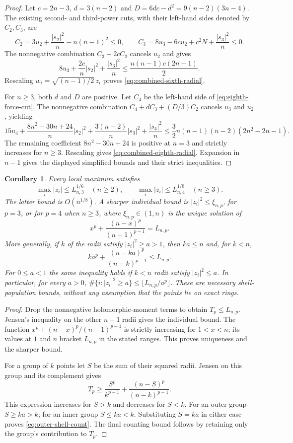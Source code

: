 \documentclass[11pt]{article}
\newtheorem{corollary}[theorem]{Corollary}
\theoremstyle{remark}
\numberwithin{equation}{section}
\begin{document}
\begin{proof}
Let $c=2n-3$, $d=3(n-2)$ and
$D=6dc-d^2=9(n-2)(3n-4)$.  The existing second- and third-power
cuts, with their left-hand sides denoted by $C_2,C_3$, are
\[
 C_2=3u_2+\frac{|s_2|^2}{n}-n(n-1)^2\le0,
 \qquad
 C_3=8u_3-6cu_2+c^2N+\frac{|s_3|^2}{n}\le0.
\]
The nonnegative combination $C_3+2cC_2$ cancels $u_2$ and gives
\[
 8u_3+\frac{2c}{n}|s_2|^2+\frac{|s_3|^2}{n}
 \le\frac{n(n-1)c(2n-1)}2.
\]
Rescaling $w_i=\sqrt{(n-1)/2}\,z_i$ proves
\eqref{eq:combined-sixth-radial}.

For $n\ge3$, both $d$ and $D$ are positive.  Let $C_4$ be the
left-hand side of \eqref{eq:eighth-force-cut}.  The nonnegative
combination $C_4+dC_3+(D/3)C_2$ cancels $u_3$ and $u_2$, yielding
\[
 15u_4+\frac{8n^2-30n+24}{n}|s_2|^2
       +\frac{3(n-2)}{n}|s_3|^2+\frac{|s_4|^2}{n}
 \le\frac32n(n-1)(n-2)(2n^2-2n-1).
\]
The remaining coefficient $8n^2-30n+24$ is positive at $n=3$
and strictly increases for $n\ge3$.  Rescaling gives
\eqref{eq:combined-eighth-radial}.  Expansion in $n-1$ gives the
displayed simplified bounds and their strict inequalities.
\end{proof}

\begin{corollary}\label{cor:local-radius-and-shells}
Every local maximum satisfies
\[
 \max_i|z_i|\le L_{n,3}^{1/6}\quad(n\ge2),\qquad
 \max_i|z_i|\le L_{n,4}^{1/8}\quad(n\ge3).
\]
The latter bound is $O(n^{1/8})$.  A sharper individual bound is
$|z_i|^2\le\xi_{n,p}$, for $p=3$, or for $p=4$ when $n\ge3$,
where $\xi_{n,p}\in(1,n)$ is the unique solution of
\[
 x^p+\frac{(n-x)^p}{(n-1)^{p-1}}=L_{n,p}.
\]
More generally, if $k$ of the radii satisfy $|z_i|^2\ge a>1$,
then $ka\le n$ and, for $k<n$,
\begin{equation}\label{eq:outer-shell-count}
 k a^p+\frac{(n-ka)^p}{(n-k)^{p-1}}\le L_{n,p}.
\end{equation}
For $0\le a<1$ the same inequality holds if $k<n$ radii satisfy
$|z_i|^2\le a$.  In particular,
for every $a>0$,
$\#\{i:|z_i|^2\ge a\}\le\lfloor L_{n,p}/a^p\rfloor$.
These are necessary shell-population bounds, without any assumption
that the points lie on exact rings.
\end{corollary}

\begin{proof}
Drop the nonnegative holomorphic-moment terms to obtain
$T_p\le L_{n,p}$.  Jensen's inequality on the other $n-1$ radii
gives the individual bound.  The function
$x^p+(n-x)^p/(n-1)^{p-1}$ is strictly increasing for $1<x<n$;
its values at $1$ and $n$ bracket $L_{n,p}$ in the stated ranges.
This proves uniqueness and the sharper bound.

For a group of $k$ points let $S$ be the sum of their squared
radii.  Jensen on this group and its complement gives
\[
 T_p\ge\frac{S^p}{k^{p-1}}
          +\frac{(n-S)^p}{(n-k)^{p-1}}.
\]
This expression increases for $S>k$ and decreases for $S<k$.
For an outer group $S\ge ka>k$; for an inner group
$S\le ka<k$.  Substituting $S=ka$ in either case proves
\eqref{eq:outer-shell-count}.  The final counting bound follows
by retaining only the group's contribution to $T_p$.
\end{proof}
\end{document}
